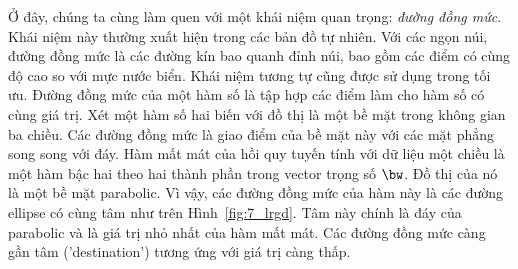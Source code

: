 Ở đây, chúng ta cùng làm quen với một khái niệm quan trọng: \textit{đường đồng
mức}. Khái niệm này thường xuất hiện trong các bản đồ tự nhiên. Với các ngọn
núi, đường đồng mức là các đường kín bao quanh đỉnh núi, bao gồm các điểm có
cùng độ cao so với mực nước biển. Khái niệm tương tự cũng được sử dụng trong tối
ưu. {Đường đồng mức} của một hàm số là tập hợp các điểm làm cho hàm số có cùng
giá trị. Xét một hàm số hai biến với đồ thị là một {bề mặt} trong
không gian ba chiều. Các đường đồng mức là giao điểm của bề mặt này với các mặt
phẳng song song với đáy. Hàm mất mát của hồi quy tuyến tính với dữ liệu một
chiều là một hàm bậc hai theo hai thành phần trong vector trọng số $\bw$. Đồ thị
của nó là một bề mặt parabolic. Vì vậy, các đường đồng mức của hàm này là các
đường ellipse có cùng tâm như trên Hình~\ref{fig:7_lrgd}. Tâm này chính là đáy
của parabolic và là giá trị nhỏ nhất của hàm mất mát. Các đường đồng mức càng
gần {tâm} ('destination') tương ứng với giá trị càng thấp.%
 
 
 
 
 
 
